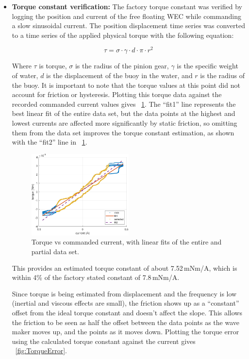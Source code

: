 \documentclass[11pt, letterpaper]{article}
\begin{document}
\begin{itemize}
\item \textbf{Torque constant verification:} 
The factory torque constant was verified by logging the position and current of the free floating WEC while commanding a slow sinusoidal current.
The position displacement time series was converted to a time series of the applied physical torque with the following equation:

\begin{equation}
  \tau = \sigma \cdot \gamma \cdot d \cdot \pi \cdot r^2
\end{equation}

Where $\tau$ is torque, $\sigma$ is the radius of the pinion gear, $\gamma$ is the specific weight of water, $d$ is the displacement of the buoy in the water, and $r$ is the radius of the buoy.
It is important to note that the torque values at this point did not account for friction or hysteresis.
Plotting this torque data against the recorded commanded current values gives  \figurename~\ref{fig:TorqueConstant}.
The ``fit1'' line represents the best linear fit of the entire data set, but the data points at the highest and lowest currents are affected more significantly by static friction, so omitting them from the data set improves the torque constant estimation, as shown with the ``fit2'' line in \figurename~\ref{fig:TorqueConstant}.
\begin{figure}[tb]
  \centering
  \includegraphics[width=0.5\textwidth]{diagrams/TorqueConstant.pdf}
  \caption{Torque vs commanded current, with linear fits of the entire and partial data set.}
  \label{fig:TorqueConstant}
\end{figure}
This provides an estimated torque constant of about 7.52\,mNm/A, which is within 4\% of the factory stated constant of 7.8\,mNm/A.


Since torque is being estimated from displacement and the frequency is low (inertial and viscous effects are small), the friction shows up as a ``constant'' offset from the ideal torque constant and doesn't affect the slope.
This allows the friction to be seen as half the offset between the data points as the wave maker moves up, and the points as it moves down. 
Plotting the torque error using the calculated torque constant against the current gives \figurename~\ref{fig:TorqueError}.


\end{itemize}
\end{document}
